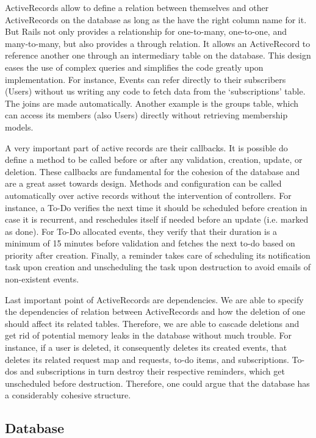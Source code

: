 \documentclass[11pt]{article}
\begin{document}
ActiveRecords allow to define a relation between themselves and other ActiveRecords on the database as long as the have the right column name for it. But Rails not only provides a relationship for one-to-many, one-to-one, and many-to-many, but also provides a through relation. It allows an ActiveRecord to reference another one through an intermediary table on the database. This design eases the use of complex queries and simplifies the code greatly upon implementation. For instance, Events can refer directly to their subscribers (Users) without us writing any code to fetch data from the ‘subscriptions’ table. The joins are made automatically. Another example is the groups table, which can access its members (also Users) directly without retrieving membership models.

A very important part of active records are their callbacks. It is possible do define a method to be called before or after any validation, creation, update, or deletion. These callbacks are fundamental for the cohesion of the database and are a great asset towards design. Methods and configuration can be called automatically over active records without the intervention of controllers. For instance, a To-Do verifies the next time it should be scheduled before creation in case it is recurrent, and reschedules itself if needed before an update (i.e. marked as done). For To-Do allocated events, they verify that their duration is a minimum of 15 minutes before validation and fetches the next to-do based on priority after creation. Finally, a reminder takes care of scheduling its notification task upon creation and unscheduling the task upon destruction to avoid emails of non-existent events.

Last important point of ActiveRecords are dependencies. We are able to specify the dependencies of relation between ActiveRecords and how the deletion of one should affect its related tables. Therefore, we are able to cascade deletions and get rid of potential memory leaks in the database without much trouble. For instance, if a user is deleted, it consequently deletes its created events, that deletes its related request map and requests, to-do items, and subscriptions. To-dos and subscriptions in turn destroy their respective reminders, which get unscheduled before destruction. Therefore, one could argue that the database has a considerably cohesive structure.

\subsection{Database}
\end{document}
